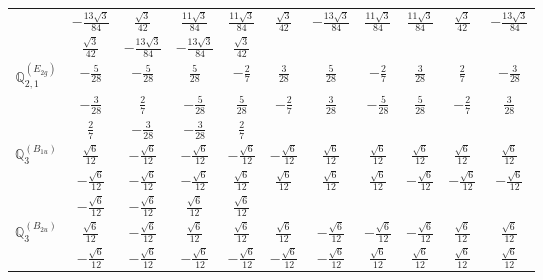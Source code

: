 \documentclass[fleqn,10pt,landscape]{article}
\begin{document}
\begin{itemize}
{\begin{center}
\begin{longtable}{ccccccccccc}
& $ - \frac{13 \sqrt{3}}{84} $ & $ \frac{\sqrt{3}}{42} $ & $ \frac{11 \sqrt{3}}{84} $ & $ \frac{11 \sqrt{3}}{84} $ & $ \frac{\sqrt{3}}{42} $ & $ - \frac{13 \sqrt{3}}{84} $ & $ \frac{11 \sqrt{3}}{84} $ & $ \frac{11 \sqrt{3}}{84} $ & $ \frac{\sqrt{3}}{42} $ & $ - \frac{13 \sqrt{3}}{84} $ \\
& $ \frac{\sqrt{3}}{42} $ & $ - \frac{13 \sqrt{3}}{84} $ & $ - \frac{13 \sqrt{3}}{84} $ & $ \frac{\sqrt{3}}{42} $ & $  $ & $  $ & $  $ & $  $ & $  $ & $  $ \\ \hline
$\mathbb{Q}_{2,1}^{(E_{2g})}$ & $ - \frac{5}{28} $ & $ - \frac{5}{28} $ & $ \frac{5}{28} $ & $ - \frac{2}{7} $ & $ \frac{3}{28} $ & $ \frac{5}{28} $ & $ - \frac{2}{7} $ & $ \frac{3}{28} $ & $ \frac{2}{7} $ & $ - \frac{3}{28} $ \\
& $ - \frac{3}{28} $ & $ \frac{2}{7} $ & $ - \frac{5}{28} $ & $ \frac{5}{28} $ & $ - \frac{2}{7} $ & $ \frac{3}{28} $ & $ - \frac{5}{28} $ & $ \frac{5}{28} $ & $ - \frac{2}{7} $ & $ \frac{3}{28} $ \\
& $ \frac{2}{7} $ & $ - \frac{3}{28} $ & $ - \frac{3}{28} $ & $ \frac{2}{7} $ & $  $ & $  $ & $  $ & $  $ & $  $ & $  $ \\ \hline
$\mathbb{Q}_{3}^{(B_{1u})}$ & $ \frac{\sqrt{6}}{12} $ & $ - \frac{\sqrt{6}}{12} $ & $ - \frac{\sqrt{6}}{12} $ & $ - \frac{\sqrt{6}}{12} $ & $ - \frac{\sqrt{6}}{12} $ & $ \frac{\sqrt{6}}{12} $ & $ \frac{\sqrt{6}}{12} $ & $ \frac{\sqrt{6}}{12} $ & $ \frac{\sqrt{6}}{12} $ & $ \frac{\sqrt{6}}{12} $ \\
& $ - \frac{\sqrt{6}}{12} $ & $ - \frac{\sqrt{6}}{12} $ & $ - \frac{\sqrt{6}}{12} $ & $ \frac{\sqrt{6}}{12} $ & $ \frac{\sqrt{6}}{12} $ & $ \frac{\sqrt{6}}{12} $ & $ \frac{\sqrt{6}}{12} $ & $ - \frac{\sqrt{6}}{12} $ & $ - \frac{\sqrt{6}}{12} $ & $ - \frac{\sqrt{6}}{12} $ \\
& $ - \frac{\sqrt{6}}{12} $ & $ - \frac{\sqrt{6}}{12} $ & $ \frac{\sqrt{6}}{12} $ & $ \frac{\sqrt{6}}{12} $ & $  $ & $  $ & $  $ & $  $ & $  $ & $  $ \\ \hline
$\mathbb{Q}_{3}^{(B_{2u})}$ & $ \frac{\sqrt{6}}{12} $ & $ - \frac{\sqrt{6}}{12} $ & $ \frac{\sqrt{6}}{12} $ & $ \frac{\sqrt{6}}{12} $ & $ \frac{\sqrt{6}}{12} $ & $ - \frac{\sqrt{6}}{12} $ & $ - \frac{\sqrt{6}}{12} $ & $ - \frac{\sqrt{6}}{12} $ & $ \frac{\sqrt{6}}{12} $ & $ \frac{\sqrt{6}}{12} $ \\
& $ - \frac{\sqrt{6}}{12} $ & $ - \frac{\sqrt{6}}{12} $ & $ - \frac{\sqrt{6}}{12} $ & $ - \frac{\sqrt{6}}{12} $ & $ - \frac{\sqrt{6}}{12} $ & $ - \frac{\sqrt{6}}{12} $ & $ \frac{\sqrt{6}}{12} $ & $ \frac{\sqrt{6}}{12} $ & $ \frac{\sqrt{6}}{12} $ & $ \frac{\sqrt{6}}{12} $ \\

\end{longtable}
\end{center}}
\end{itemize}
\end{document}
